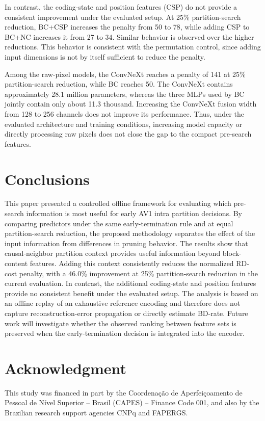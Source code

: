 \documentclass{article}
\begin{document}
In contrast, the coding-state and position features (CSP) do not provide
a consistent improvement under the evaluated setup. At 25\% partition-search reduction, BC+CSP increases the penalty from 50 to 78, while adding CSP to BC+NC increases it from 27 to 34. Similar behavior is observed over the higher reductions. This behavior is consistent with the permutation control, since adding input dimensions is not by itself sufficient to reduce the penalty.

Among the raw-pixel models, the ConvNeXt reaches a penalty of 141 at 25\% partition-search reduction, while BC reaches 50. The ConvNeXt contains approximately 28.1 million parameters, whereas the three MLPs used by BC jointly contain only about 11.3 thousand. Increasing the ConvNeXt fusion width from 128 to 256 channels does not improve its performance. Thus, under the evaluated architecture and training conditions, increasing model capacity or directly processing raw pixels does not close the gap to the compact pre-search features.



\section{Conclusions}
\label{sec:conclusions}

This paper presented a controlled offline framework for evaluating which pre-search information is most useful for early AV1 intra partition decisions. By comparing predictors under the same early-termination rule and at equal partition-search reduction, the proposed methodology separates the effect of the input information from differences in pruning behavior.
The results show that causal-neighbor partition context provides useful information beyond block-content features. 
Adding this context consistently reduces the normalized RD-cost penalty, with a 46.0\% improvement at 25\% partition-search reduction in the current evaluation. In contrast, the additional coding-state and position features provide no consistent benefit under the evaluated setup.
The analysis is based on an offline replay of an exhaustive reference encoding and therefore does not capture reconstruction-error propagation or directly estimate BD-rate. Future work will investigate whether the observed ranking between feature sets is preserved when the early-termination decision is integrated into the encoder.

\section{Acknowledgment}
\label{sec:ack}

This study was financed in part by the Coor\-de\-na\c{c}\~ao de
Aper\-fei\-\c{c}oa\-men\-to de Pes\-so\-al de N\'ivel Su\-pe\-ri\-or -- Brasil
(CAPES) -- Finance Code 001, and also by the Brazilian research support agencies
CNPq and FAPERGS.



\end{document}
